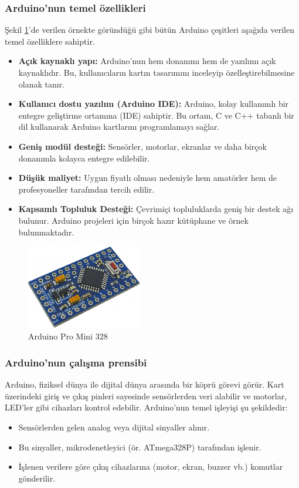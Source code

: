 \subsubsection{Arduino'nun temel özellikleri}
    Şekil \ref{fig:6}'de verilen örnekte göründüğü gibi bütün Arduino
çeşitleri aşağıda verilen temel özelliklere sahiptir.
\begin{itemize}   
\item \textbf{Açık kaynaklı yapı:} Arduino'nun hem donanımı hem de yazılımı açık kaynaklıdır. Bu, kullanıcıların kartın tasarımını inceleyip özelleştirebilmesine olanak tanır.
\item \textbf{Kullanıcı dostu yazılım (Arduino IDE):} Arduino, kolay kullanımlı bir entegre geliştirme ortamına (IDE) sahiptir. Bu ortam, C ve C++ tabanlı bir dil kullanarak Arduino kartlarını programlamayı sağlar.
\item \textbf{Geniş modül desteği:} Sensörler, motorlar, ekranlar ve daha birçok donanımla kolayca entegre edilebilir.
\item \textbf{Düşük maliyet:} Uygun fiyatlı olması nedeniyle hem amatörler hem de profesyoneller tarafından tercih edilir.
\item \textbf{Kapsamlı Topluluk Desteği:} Çevrimiçi topluluklarda geniş bir destek ağı bulunur. Arduino projeleri için birçok hazır kütüphane ve örnek bulunmaktadır.
\end{itemize}

    
\begin{figure}[H]
\centering
\includegraphics[width=0.45\textwidth]{Resimler/6.png}
\caption{Arduino Pro Mini 328}
\label{fig:6}
\end{figure}
\subsubsection{Arduino'nun çalışma prensibi}
   
    Arduino, fiziksel dünya ile dijital dünya arasında bir köprü görevi görür. Kart üzerindeki giriş ve çıkış pinleri sayesinde sensörlerden veri alabilir ve motorlar, LED'ler gibi cihazları kontrol edebilir. Arduino'nun temel işleyişi şu şekildedir:
\begin{itemize}
\item Sensörlerden gelen analog veya dijital sinyaller alınır.
\item Bu sinyaller, mikrodenetleyici (ör. ATmega328P) tarafından işlenir.
\item İşlenen verilere göre çıkış cihazlarına (motor, ekran, buzzer vb.) komutlar gönderilir.
\end{itemize}

